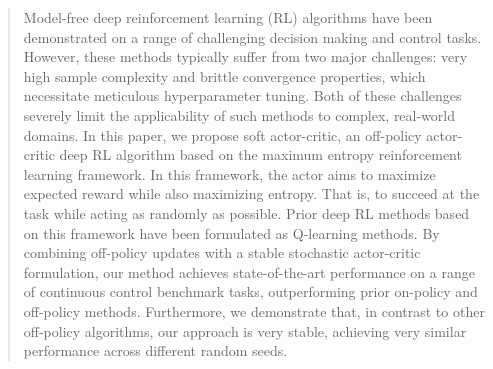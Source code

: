 \documentclass{article}
\begin{document}

%

%
%
%
%
%

\printAffiliationsAndNotice{}  %
%

\begin{abstract}
Model-free deep reinforcement learning (RL) algorithms have been demonstrated on a range of challenging decision making and control tasks. However, these methods typically suffer from two major challenges: very high sample complexity and brittle convergence properties, which necessitate meticulous hyperparameter tuning. Both of these challenges severely limit the applicability of such methods to complex, real-world domains. In this paper, we propose soft actor-critic, an off-policy actor-critic deep RL algorithm based on the maximum entropy reinforcement learning framework. In this framework, the actor aims to maximize expected reward while also maximizing entropy. That is, to succeed at the task while acting as randomly as possible. Prior deep RL methods based on this framework have been formulated as Q-learning methods. By combining off-policy updates with a stable stochastic actor-critic formulation, our method achieves state-of-the-art performance on a range of continuous control benchmark tasks, outperforming prior on-policy and off-policy methods. Furthermore, we demonstrate that, in contrast to other off-policy algorithms, our approach is very stable, achieving very similar performance across different random seeds.
\end{abstract}
\end{document}
